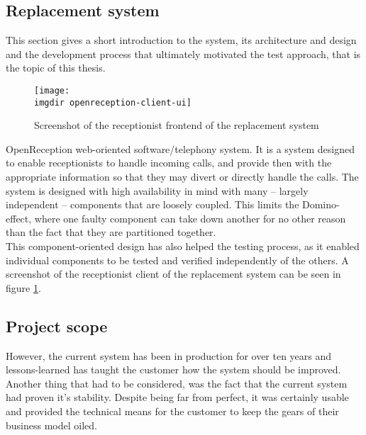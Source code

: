 \subsection{Replacement system}
This section gives a short introduction to the system, its architecture and design and the development process that ultimately motivated the test approach, that is the topic of this thesis.\medskip
\begin{figure}[!hbpt]
\centering
\texttt{[image: \\imgdir openreception-client-ui]}
\caption{Screenshot of the receptionist frontend of the replacement system}
\label{fig:openreception-client-ui}
\end{figure}
\noindent OpenReception web-oriented software/telephony system. It is a system designed to enable receptionists to handle incoming calls, and provide then with the appropriate information so that they may divert or directly handle the calls. The system is designed with high availability in mind with many -- largely independent -- components that are loosely coupled. This limits the Domino-effect, where one faulty component can take down another for no other reason than the fact that they are partitioned together.\\ This component-oriented design has also helped the testing process, as it enabled individual components to be tested and verified independently of the others. A screenshot of the receptionist client of the replacement system can be seen in figure \ref{fig:openreception-client-ui}.

\subsection{Project scope}
However, the current system has been in production for over ten years and lessons-learned has taught the customer how the system should be improved. Another thing that had to be considered, was the fact that the current system had proven it's stability. Despite being far from perfect, it was certainly usable and provided the technical means for the customer to keep the gears of their business model oiled.

